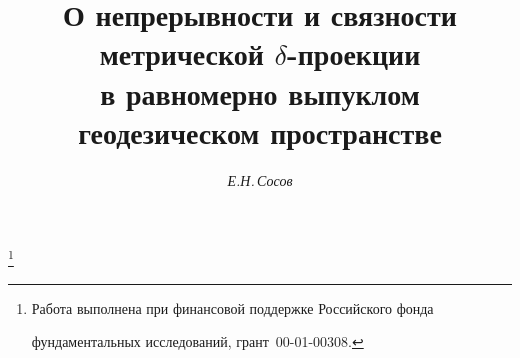 




%





\newcommand{\diam}{\operatorname{diam}}


\newcommand{\tts}[1]{}







\setcounter{page}{55}















\author{\it Е.Н.\,Сосов}




\title{О непрерывности и связности метрической $\delta$-проекции\\


в равномерно выпуклом геодезическом пространстве}


\thanks{Работа выполнена при финансовой поддержке Российского фонда


фундаментальных исследований, грант \No\,00-01-00308.}








\date{}




\pagestyle{plain} %







